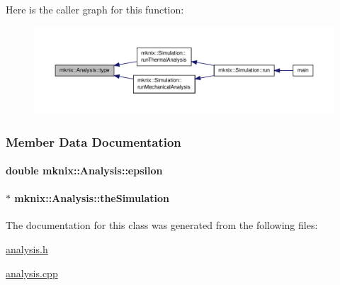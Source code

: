 Here is the caller graph for this function\-:\nopagebreak
\begin{figure}[H]
\begin{center}
\leavevmode
\includegraphics[width=350pt]{df/d86/classmknix_1_1_analysis_a6dd7026a22ae11f3eef3dad3be370e70_icgraph}
\end{center}
\end{figure}




\subsubsection{Member Data Documentation}
\hypertarget{classmknix_1_1_analysis_a7e0439caf5fa5f90d808acec6d75b72f}{
\paragraph[{epsilon}]{\setlength{\rightskip}{0pt plus 5cm}double mknix\-::\-Analysis\-::epsilon\hspace{0.3cm}{\ttfamily [protected]}}}\label{classmknix_1_1_analysis_a7e0439caf5fa5f90d808acec6d75b72f}
\hypertarget{classmknix_1_1_analysis_a1abc29e3b8565590b6bf0ce2d8b3b68f}{
\paragraph[{the\-Simulation}]{$\ast$ mknix\-::\-Analysis\-::the\-Simulation\hspace{0.3cm}{\ttfamily [protected]}}}\label{classmknix_1_1_analysis_a1abc29e3b8565590b6bf0ce2d8b3b68f}


The documentation for this class was generated from the following files\-:\begin{DoxyCompactItemize}
\item 
\hyperlink{analysis_8h}{analysis.\-h}\item 
\hyperlink{analysis_8cpp}{analysis.\-cpp}\end{DoxyCompactItemize}
